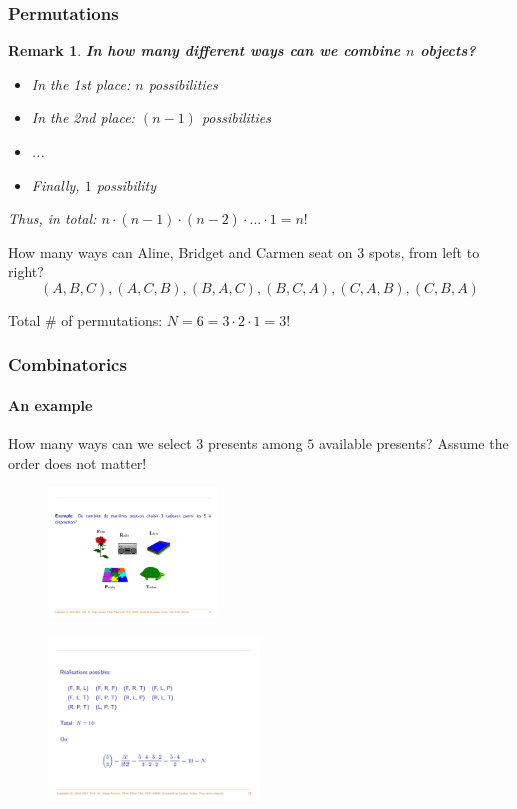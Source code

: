 \documentclass[notes=show]{beamer}\usepackage[]{graphicx}\usepackage[]{color}
\newtheorem{remark}{Remark}[section]
\begin{document}
\begin{frame}
\frametitle{Permutations}
\begin{remark}
\textbf{In how many different ways can we combine $n$ objects?}
\begin{itemize}
\item In the 1st place: $n$ possibilities
\item In the 2nd place: $(n-1)$ possibilities
\item ...
\item Finally, $1$ possibility
\end{itemize}
Thus, in total: $ n\cdot(n-1)\cdot(n-2)\cdot...\cdot1 = n !$
\end{remark}
\pause
\begin{example}
How many ways can Aline, Bridget and Carmen seat on 3 spots, from left to right?
$$
(A, B, C), (A, C, B), (B, A, C), (B, C, A), (C, A, B), (C, B, A)
$$

Total $\#$ of permutations: $N = 6 = 3 \cdot 2 \cdot 1 = 3!$
\end{example}
\end{frame}


\begin{frame}
\frametitle{Combinatorics}
\framesubtitle{An example}
\begin{example}
\small{How many ways can we select $3$ presents among $5$ available presents?
Assume the order does not matter!}

\begin{figure}[h!]
\includegraphics[width=0.4\textwidth,height=0.35\textheight]{gifts.pdf}
\end{figure}

\begin{figure}[h!]
\includegraphics[width=0.5\textwidth,height=0.2\textheight]{outcomes.pdf}
\end{figure}
\end{example}

\end{frame}
\end{document}
